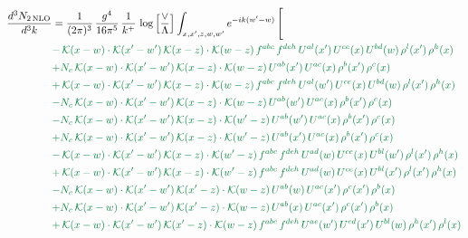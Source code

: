 \documentclass[10pt]{article}
\numberwithin{equation}{section}
\begin{document}
\begin{align}
\frac{d^{3}N_{2\,\mathrm{NLO}}}{d^{3}k} & = \frac{1}{(2\pi)^{3}}\,\frac{g^{4}}{16\pi^{5}}\,\frac{1}{k^{+}}\,\log\Big[\frac{\vee}{\Lambda}\Big]\int_{x,x',z,w,w'}e^{-ik(w'-w)}\,\Bigg[\notag\\ &{\color{JIM} -\,\mathcal{K}(x-w)\cdot\mathcal{K}(x'-w')\,\mathcal{K}(x-z)\cdot\mathcal{K}(w-z)\,f^{abc}\,f^{deh}\,U^{al}(x')\,U^{ce}(x)\,U^{bd}(w)\,\rho^{l}(x')\,\rho^{h}(x)} \notag\\
&{\color{JIM} +N_{c}\,\mathcal{K}(x-w)\cdot\mathcal{K}(x'-w')\,\mathcal{K}(x-z)\cdot\mathcal{K}(w-z)\,U^{ab}(x')\,U^{ac}(x)\,\rho^{b}(x')\,\rho^{c}(x)} \notag\\
&{\color{JIM} +\,\mathcal{K}(x-w)\cdot\mathcal{K}(x'-w')\,\mathcal{K}(x-z)\cdot\mathcal{K}(w-z)\,f^{abc}\,f^{deh}\,U^{al}(w')\,U^{ce}(x)\,U^{bd}(w)\,\rho^{l}(x')\,\rho^{h}(x)} \notag\\
&{\color{JIM} -N_{c}\,\mathcal{K}(x-w)\cdot\mathcal{K}(x'-w')\,\mathcal{K}(x-z)\cdot\mathcal{K}(w-z)\,U^{ab}(w')\,U^{ac}(x)\,\rho^{b}(x')\,\rho^{c}(x)} \notag\\
&{\color{JIM} -N_{c}\,\mathcal{K}(x-w)\cdot\mathcal{K}(x'-w')\,\mathcal{K}(x-z)\cdot\mathcal{K}(w'-z)\,U^{ab}(w')\,U^{ac}(x)\,\rho^{b}(x')\,\rho^{c}(x)} \notag\\
&{\color{JIM} +N_{c}\,\mathcal{K}(x-w)\cdot\mathcal{K}(x'-w')\,\mathcal{K}(x-z)\cdot\mathcal{K}(w'-z)\,U^{ab}(x')\,U^{ac}(x)\,\rho^{b}(x')\,\rho^{c}(x)} \notag\\
&{\color{JIM} -\,\mathcal{K}(x-w)\cdot\mathcal{K}(x'-w')\,\mathcal{K}(x-z)\cdot\mathcal{K}(w'-z)\,f^{abc}\,f^{deh}\,U^{ad}(w)\,U^{ce}(x)\,U^{bl}(w')\,\rho^{l}(x')\,\rho^{h}(x)} \notag\\
&{\color{JIM} +\,\mathcal{K}(x-w)\cdot\mathcal{K}(x'-w')\,\mathcal{K}(x-z)\cdot\mathcal{K}(w'-z)\,f^{abc}\,f^{deh}\,U^{ad}(w)\,U^{ce}(x)\,U^{bl}(x')\,\rho^{l}(x')\,\rho^{h}(x)} \notag\\
&{\color{JIM} -N_{c}\,\mathcal{K}(x-w)\cdot\mathcal{K}(x'-w')\,\mathcal{K}(x'-z)\cdot\mathcal{K}(w-z)\,U^{ab}(w)\,U^{ac}(x')\,\rho^{c}(x')\,\rho^{b}(x)} \notag\\
&{\color{JIM} +N_{c}\,\mathcal{K}(x-w)\cdot\mathcal{K}(x'-w')\,\mathcal{K}(x'-z)\cdot\mathcal{K}(w-z)\,U^{ab}(x)\,U^{ac}(x')\,\rho^{c}(x')\,\rho^{b}(x)} \notag\\
&{\color{JIM} +\,\mathcal{K}(x-w)\cdot\mathcal{K}(x'-w')\,\mathcal{K}(x'-z)\cdot\mathcal{K}(w-z)\,f^{abc}\,f^{deh}\,U^{ae}(w')\,U^{cd}(x')\,U^{bl}(w)\,\rho^{h}(x')\,\rho^{l}(x)} \notag\\

\end{align}
\end{document}
